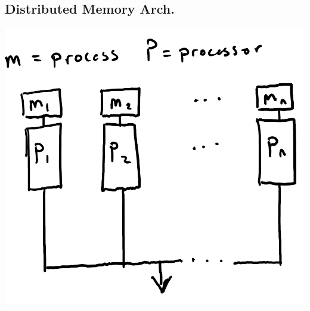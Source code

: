 \documentclass{report}
\begin{document}
\subsection{Distributed Memory Arch.}
\begin{center}
\includegraphics[scale=0.5]{DistributedMemoryArch.png}
\end{center}
\end{document}
